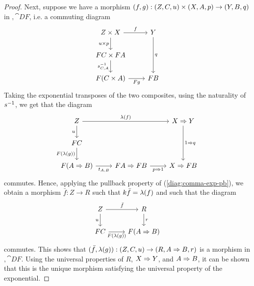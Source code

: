 \begin{lem}
\begin{proof}
Next, suppose we have a morphism $(f, g) : (Z, C, u) \times (X, A, p) \to (Y, B, q)$ in $\comma{\cat{D}}{F}$, i.e. a commuting diagram
\[\begin{tikzcd}
	{\cprod{Z}{X}} & Y \\
	{\cprod{FC}{FA}} \\
	{F(\cprod{C}{A})} & FB
	\arrow["{\inv{\prodcmp[C,A]}}"', from=2-1, to=3-1]
	\arrow["{\cprod{u}{p}}"', from=1-1, to=2-1]
	\arrow["f", from=1-1, to=1-2]
	\arrow["q", from=1-2, to=3-2]
	\arrow["Fg"', from=3-1, to=3-2]
\end{tikzcd}\]
Taking the exponential transposes of the two composites, using the naturality of $\inv{\prodcmp}$, we get that the diagram
\[\begin{tikzcd}
	Z && {\cexp{X}{Y}} \\
	FC \\
	{F(\cexp{A}{B})} & {\cexp{FA}{FB}} & {\cexp{X}{FB}}
	\arrow["u"', from=1-1, to=2-1]
	\arrow["{F(\mcurry{g})}"', from=2-1, to=3-1]
	\arrow["{\expcmp[A,B]}"', from=3-1, to=3-2]
	\arrow["{\cexp{p}{\id}}"', from=3-2, to=3-3]
	\arrow["{\cexp{\id}{q}}", from=1-3, to=3-3]
	\arrow["{\mcurry{f}}", from=1-1, to=1-3]
\end{tikzcd}\]
commutes. Hence, applying the pullback property of (\ref{diag:comma-exp-pb}), we obtain a morphism $\bar{f} : Z \to R$ such that $k\bar{f} = \lambda(f)$ and such that the diagram
\[\begin{tikzcd}
	Z & R \\
	FC & {F(\cexp{A}{B})}
	\arrow["{\bar{f}}", from=1-1, to=1-2]
	\arrow["r", from=1-2, to=2-2]
	\arrow["u"', from=1-1, to=2-1]
	\arrow["{F(\mcurry{g})}"', from=2-1, to=2-2]
\end{tikzcd}\]
commutes. This shows that $(\bar{f}, \lambda(g)) : (Z, C, u) \to (R, A \Rightarrow B, r)$ is a morphism in $\comma{\cat{D}}{F}$.
Using the universal properties of $R$, $X \Rightarrow Y$, and $A \Rightarrow B$, it can be shown that this is the unique morphism satisfying the universal property of the exponential.
\end{proof}
\end{lem}

